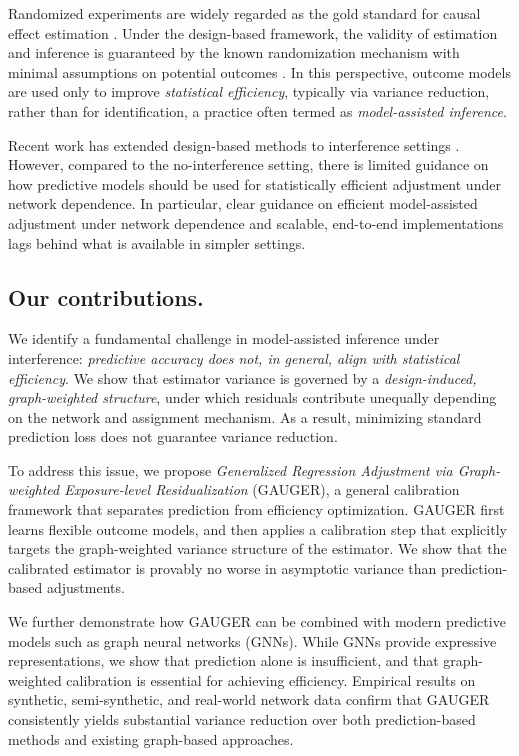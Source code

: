 \documentclass{article}
\theoremstyle{plain}
\theoremstyle{definition}
\theoremstyle{remark}
\begin{document}
Randomized experiments are widely regarded as the gold standard for causal effect estimation \citep{hinkelmann2007design, imbens2015causal}. Under the design-based framework, the validity of estimation and inference is guaranteed by the known randomization mechanism with minimal assumptions on potential outcomes \citep{neyman1923application, rubin2005causal, ding2024first}. In this perspective, outcome models are used only to improve \emph{statistical efficiency}, typically via variance reduction, rather than for identification, a practice often termed as \emph{model-assisted inference}.

Recent work has extended design-based methods to interference settings \citep{hudgens2008toward, aronow2017estimating, basse2018analyzing, chang2023design, leung2022causal, gao2023causal}. However, compared to the no-interference setting, there is limited guidance on how predictive models should be used for statistically efficient adjustment under network dependence. In particular, clear guidance on efficient model-assisted adjustment under network dependence and scalable, end-to-end implementations lags behind what is available in simpler settings.

\subsection{Our contributions.}
We identify a fundamental challenge in model-assisted inference under interference: \emph{predictive accuracy does not, in general, align with statistical efficiency}. We show that estimator variance is governed by a \emph{design-induced, graph-weighted structure}, under which residuals contribute unequally depending on the network and assignment mechanism. As a result, minimizing standard prediction loss does not guarantee variance reduction.

To address this issue, we propose \emph{Generalized Regression Adjustment via Graph-weighted Exposure-level Residualization} (GAUGER), a general calibration framework that separates prediction from efficiency optimization. GAUGER first learns flexible outcome models, and then applies a calibration step that explicitly targets the graph-weighted variance structure of the estimator. We show that the calibrated estimator is provably no worse in asymptotic variance than prediction-based adjustments.

We further demonstrate how GAUGER can be combined with modern predictive models such as graph neural networks (GNNs). While GNNs provide expressive representations, we show that prediction alone is insufficient, and that graph-weighted calibration is essential for achieving efficiency. Empirical results on synthetic, semi-synthetic, and real-world network data confirm that GAUGER consistently yields substantial variance reduction over both prediction-based methods and existing graph-based approaches.
\end{document}
